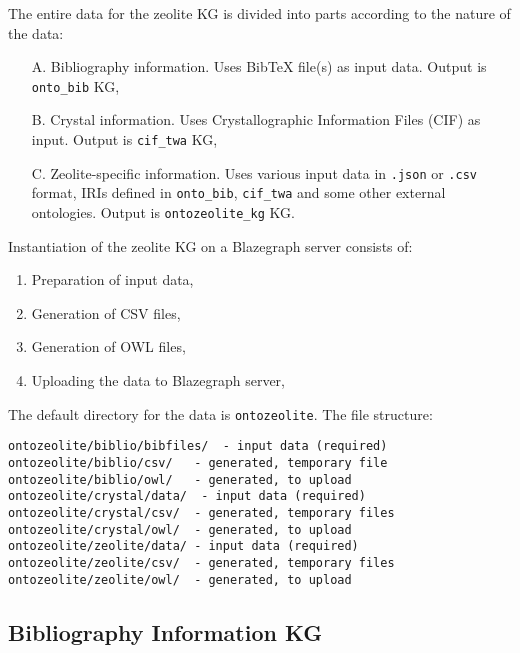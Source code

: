 \documentclass{article}
\begin{document}
The entire data for the zeolite KG is divided into parts according to the nature of the data:
\begin{enumerate}
    \item[A.] Bibliography information. Uses Bib\TeX{} file(s) as input data.
    Output is \texttt{onto\_bib} KG,
    \item[B.] Crystal information. Uses Crystallographic Information Files (CIF) as input.
    Output is \texttt{cif\_twa} KG,
    \item[C.] Zeolite-specific information. Uses various input data
    in \texttt{.json} or \texttt{.csv} format, 
    IRIs defined in \texttt{onto\_bib}, \texttt{cif\_twa} and some other external ontologies.
    Output is \texttt{ontozeolite\_kg} KG.
\end{enumerate}

Instantiation of the zeolite KG on a Blazegraph server
consists of:
\begin{enumerate}
\item Preparation of input data,
\item Generation of CSV files,
\item Generation of OWL files,
\item Uploading the data to Blazegraph server,
\end{enumerate}

The default directory for the data is \texttt{ontozeolite}.
The file structure:
\begin{verbatim}
ontozeolite/biblio/bibfiles/  - input data (required)
ontozeolite/biblio/csv/   - generated, temporary file
ontozeolite/biblio/owl/   - generated, to upload
ontozeolite/crystal/data/  - input data (required)
ontozeolite/crystal/csv/  - generated, temporary files
ontozeolite/crystal/owl/  - generated, to upload
ontozeolite/zeolite/data/ - input data (required)
ontozeolite/zeolite/csv/  - generated, temporary files
ontozeolite/zeolite/owl/  - generated, to upload
\end{verbatim}

\subsection{Bibliography Information KG}
\label{sec:zeolite_data_biblio}
\end{document}
